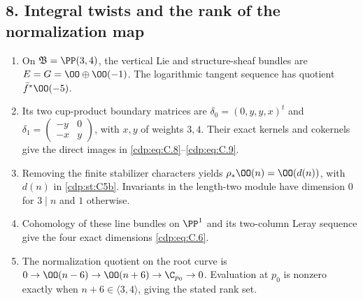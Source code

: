 \subsection*{8. Integral twists and the rank of the normalization map}
\RungOne
\begin{enumerate}[label=\arabic*.,leftmargin=*]
\item On $\mathfrak B=\PP(3,4)$, the vertical Lie and
structure-sheaf bundles are $E=G=\OO\oplus\OO(-1)$.
The logarithmic tangent sequence has quotient $\bar f^*\OO(-5)$.
\item Its two cup-product boundary matrices are
$\delta_0=(0,y,y,x)^t$ and
$\delta_1=\left(\begin{smallmatrix}-y&0\\-x&y\end{smallmatrix}\right)$,
with $x,y$ of weights $3,4$.  Their exact kernels and cokernels
give the direct images in \eqref{cdp:eq:C.8}--\eqref{cdp:eq:C.9}.
\item Removing the finite stabilizer characters yields
$\rho_*\OO(n)=\OO(d(n))$, with $d(n)$ in
\ref{cdp:st:C5b}.  Invariants in the length-two module have
dimension $0$ for $3\mid n$ and $1$ otherwise.
\item Cohomology of these line bundles on $\PP^1$ and its
two-column Leray sequence give the four exact dimensions
\eqref{cdp:eq:C.6}.
\item The normalization quotient on the root curve is
$0\to\OO(n-6)\to\OO(n+6)\to\C_{p_0}\to0$.
Evaluation at $p_0$ is nonzero exactly when
$n+6\in\langle3,4\rangle$, giving the stated rank set.
\end{enumerate}


